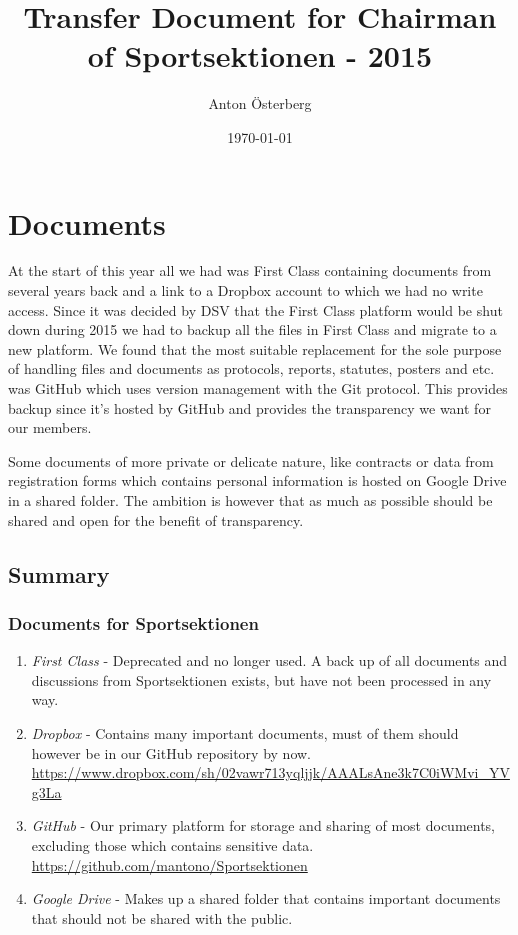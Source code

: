 \documentclass[12pt,a4paper]{article}
\begin{document}
	\title{\Huge Transfer Document for Chairman of Sportsektionen - 2015}
	\author{Anton Österberg}
	\date{\today}

	\maketitle

	\null
	\vfill

	\clearpage

	\tableofcontents

	\clearpage

	\section{Documents}
	At the start of this year all we had was First Class containing documents from several years back and a link to a Dropbox account to which we had no write access. Since it was decided by DSV that the First Class platform would be shut down during 2015 we had to backup all the files in First Class and migrate to a new platform. We found that the most suitable replacement for the sole purpose of handling files and documents as protocols, reports, statutes, posters and etc. was GitHub which uses version management with the Git protocol. This provides backup since it's hosted by GitHub and provides the transparency we want for our members.

	Some documents of more private or delicate nature, like contracts or data from registration forms which contains personal information is hosted on Google Drive in a shared folder. The ambition is however that as much as possible should be shared and open for the benefit of transparency.

		\subsection{Summary}
		\subsubsection{Documents for Sportsektionen}

		\begin{enumerate}
			\item \emph{First Class} - Deprecated and no longer used. A back up of all documents and discussions from Sportsektionen exists, but have not been processed in any way.
			\item \emph{Dropbox} - Contains many important documents, must of them should however be in our GitHub repository by now.\\
			\url{https://www.dropbox.com/sh/02vawr713yqljjk/AAALsAne3k7C0iWMvi_YVg3La}
			\item \emph{GitHub} - Our primary platform for storage and sharing of most documents, excluding those which contains sensitive data.\\
			\url{https://github.com/mantono/Sportsektionen}
			\item \emph{Google Drive} - Makes up a shared folder that contains important documents that should not be shared with the public.
		\end{enumerate}
\end{document}
